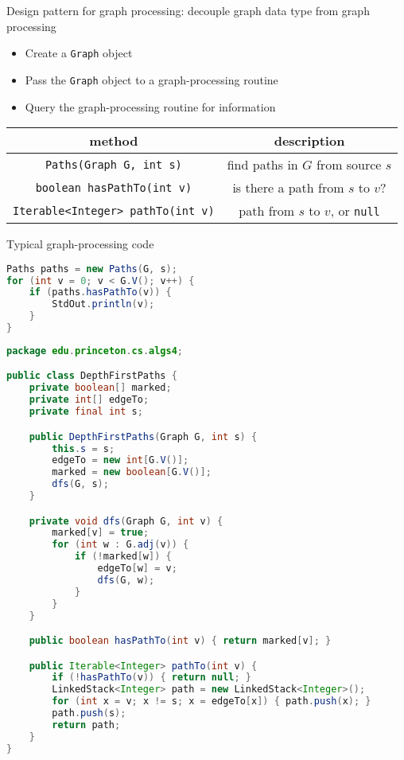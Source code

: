 \documentclass[8pt,a4paper,compress]{beamer}
\begin{document}
\begin{frame}[fragile]
\pause

Design pattern for graph processing: decouple graph data type from graph processing
\begin{itemize}
\item Create a \lstinline{Graph} object
\item Pass the \lstinline{Graph} object to a graph-processing routine
\item Query the graph-processing routine for information
\end{itemize}

\begin{center}
\begin{tabular}{cc}
method & description \\ \hline
\lstinline$Paths(Graph G, int s)$ & find paths in $G$ from source $s$ \\
\lstinline$boolean hasPathTo(int v)$ & is there a path from $s$ to $v$? \\
\lstinline$Iterable<Integer> pathTo(int v)$ & path from $s$ to $v$, or \lstinline$null$
\end{tabular} 
\end{center}

\pause
\bigskip

Typical graph-processing code
\begin{lstlisting}[language=Java]
Paths paths = new Paths(G, s);
for (int v = 0; v < G.V(); v++) {
    if (paths.hasPathTo(v)) {
        StdOut.println(v);
    }
}
\end{lstlisting}
\end{frame}

\begin{frame}[fragile]
\pause

\begin{lstlisting}[language=Java]
package edu.princeton.cs.algs4;

public class DepthFirstPaths {
    private boolean[] marked; 
    private int[] edgeTo; 
    private final int s; 

    public DepthFirstPaths(Graph G, int s) {
        this.s = s;
        edgeTo = new int[G.V()];
        marked = new boolean[G.V()];
        dfs(G, s);
    }

    private void dfs(Graph G, int v) {
        marked[v] = true;
        for (int w : G.adj(v)) {
            if (!marked[w]) {
                edgeTo[w] = v;
                dfs(G, w);
            }
        }
    }

    public boolean hasPathTo(int v) { return marked[v]; }

    public Iterable<Integer> pathTo(int v) {
        if (!hasPathTo(v)) { return null; }
        LinkedStack<Integer> path = new LinkedStack<Integer>();
        for (int x = v; x != s; x = edgeTo[x]) { path.push(x); }
        path.push(s);
        return path;
    }
}
\end{lstlisting}
\end{frame}
\end{document}

